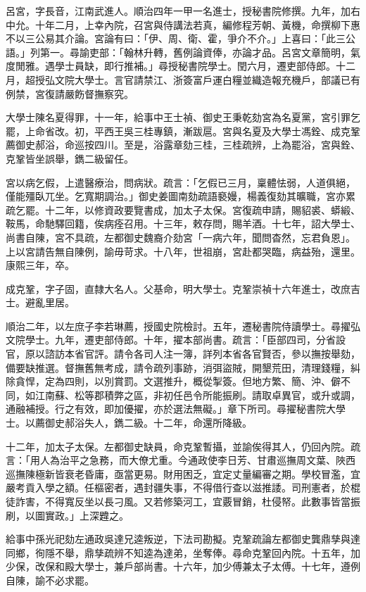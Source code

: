 \begin{pinyinscope}
呂宮，字長音，江南武進人。順治四年一甲一名進士，授秘書院修撰。九年，加右中允。十年二月，上幸內院，召宮與侍講法若真，編修程芳朝、黃機，命撰柳下惠不以三公易其介論。宮論有曰：「伊、周、衛、霍，爭介不介。」上喜曰：「此三公語。」列第一。尋諭吏部：「翰林升轉，舊例論資俸，亦論才品。呂宮文章簡明，氣度閒雅。遇學士員缺，即行推補。」尋授秘書院學士。閏六月，遷吏部侍郎。十二月，超授弘文院大學士。言官請禁江、浙簽富戶運白糧並織造報充機戶，部議已有例禁，宮復請嚴飭督撫察究。

大學士陳名夏得罪，十一年，給事中王士禎、御史王秉乾劾宮為名夏黨，宮引罪乞罷，上命省改。初，平西王吳三桂專鎮，漸跋扈。宮與名夏及大學士馮銓、成克鞏薦御史郝浴，命巡按四川。至是，浴露章劾三桂，三桂疏辨，上為罷浴，宮與銓、克鞏皆坐誤舉，鐫二級留任。

宮以病乞假，上遣醫療治，問病狀。疏言：「乞假已三月，稟體怯弱，人道俱絕，僅能殭臥兀坐。乞寬期調治。」御史姜圖南劾疏語褻嫚，楊義復劾其曠職，宮亦累疏乞罷。十二年，以修資政要覽書成，加太子太保。宮復疏申請，賜貂裘、蟒緞、鞍馬，命馳驛回籍，俟病痊召用。十三年，敕存問，賜羊酒。十七年，詔大學士、尚書自陳，宮不具疏，左都御史魏裔介劾宮「一病六年，聞問杳然，忘君負恩」。上以宮請告無自陳例，諭毋苛求。十八年，世祖崩，宮赴都哭臨，病益殆，還里。康熙三年，卒。

成克鞏，字子固，直隸大名人。父基命，明大學士。克鞏崇禎十六年進士，改庶吉士。避亂里居。

順治二年，以左庶子李若琳薦，授國史院檢討。五年，遷秘書院侍讀學士。尋擢弘文院學士。九年，遷吏部侍郎。十年，擢本部尚書。疏言：「臣部四司，分省設官，原以諮訪本省官評。請令各司人注一簿，詳列本省各官賢否，參以撫按舉劾，備要缺推選。督撫舊無考成，請令疏列事跡，消弭盜賊，開墾荒田，清理錢糧，糾除貪悍，定為四則，以別賞罰。文選推升，概從掣簽。但地方繁、簡、沖、僻不同，如江南蘇、松等郡積弊之區，非初任邑令所能振刷。請取卓異官，或升或調，通融補授。行之有效，即加優擢，亦於選法無礙。」章下所司。尋擢秘書院大學士。以薦御史郝浴失人，鐫二級。十二年，命還所降級。

十二年，加太子太保。左都御史缺員，命克鞏暫攝，並諭俟得其人，仍回內院。疏言：「用人為治平之急務，而大僚尤重。今通政使李日芳、甘肅巡撫周文葉、陜西巡撫陳極新皆衰老昏庸，亟當更易。財用困乏，宜定丈量編審之期。學校冒濫，宜嚴考貢入學之額。任樞密者，遇封疆失事，不得借行查以滋推諉。司刑憲者，於棍徒詐害，不得寬反坐以長刁風。又若修築河工，宜覈冒銷，杜侵帑。此數事皆當振刷，以圖實政。」上深韙之。

給事中孫光祀劾左通政吳達兄逵叛逆，下法司勘擬。克鞏疏論左都御史龔鼎孳與達同鄉，徇隱不舉，鼎孳疏辨不知逵為達弟，坐奪俸。尋命克鞏回內院。十五年，加少保，改保和殿大學士，兼戶部尚書。十六年，加少傅兼太子太傅。十七年，遵例自陳，諭不必求罷。


\end{pinyinscope}
